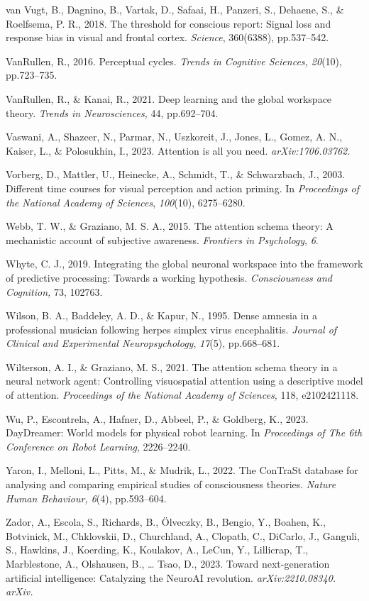 \documentclass[12pt]{article}
\begin{document}
van Vugt, B., Dagnino, B., Vartak, D., Safaai, H., Panzeri, S., Dehaene,
S., \& Roelfsema, P. R., 2018. The threshold for conscious report:
Signal loss and response bias in visual and frontal cortex.
\emph{Science}, 360(6388), pp.537--542.

VanRullen, R., 2016. Perceptual cycles. \emph{Trends in Cognitive
Sciences, 20}(10), pp.723--735.

VanRullen, R., \& Kanai, R., 2021. Deep learning and the global
workspace theory. \emph{Trends in Neurosciences,} 44, pp.692--704.

Vaswani, A., Shazeer, N., Parmar, N., Uszkoreit, J., Jones, L., Gomez,
A. N., Kaiser, L., \& Polosukhin, I., 2023. Attention is all you need.
\emph{arXiv:1706.03762.}

Vorberg, D., Mattler, U., Heinecke, A., Schmidt, T., \& Schwarzbach, J.,
2003. Different time courses for visual perception and action priming.
In \emph{Proceedings of the National Academy of Sciences},
\emph{100}(10), 6275--6280.

Webb, T. W., \& Graziano, M. S. A., 2015. The attention schema theory: A
mechanistic account of subjective awareness. \emph{Frontiers in
Psychology}, \emph{6}.

Whyte, C. J., 2019. Integrating the global neuronal workspace into the
framework of predictive processing: Towards a working hypothesis.
\emph{Consciousness and Cognition,} 73, 102763.

Wilson, B. A., Baddeley, A. D., \& Kapur, N., 1995. Dense amnesia in a
professional musician following herpes simplex virus encephalitis.
\emph{Journal of Clinical and Experimental Neuropsychology},
\emph{17}(5), pp.668--681.

Wilterson, A. I., \& Graziano, M. S., 2021. The attention schema theory
in a neural network agent: Controlling visuospatial attention using a
descriptive model of attention. \emph{Proceedings of the National
Academy of Sciences,} 118, e2102421118.

Wu, P., Escontrela, A., Hafner, D., Abbeel, P., \& Goldberg, K., 2023.
DayDreamer: World models for physical robot learning. In
\emph{Proceedings of The 6th Conference on Robot Learning}, 2226--2240.

Yaron, I., Melloni, L., Pitts, M., \& Mudrik, L., 2022. The ConTraSt
database for analysing and comparing empirical studies of consciousness
theories. \emph{Nature Human Behaviour, 6}(4), pp.593--604.

Zador, A., Escola, S., Richards, B., Ölveczky, B., Bengio, Y., Boahen,
K., Botvinick, M., Chklovskii, D., Churchland, A., Clopath, C., DiCarlo,
J., Ganguli, S., Hawkins, J., Koerding, K., Koulakov, A., LeCun, Y.,
Lillicrap, T., Marblestone, A., Olshausen, B., \ldots{} Tsao, D., 2023.
Toward next-generation artificial intelligence: Catalyzing the NeuroAI
revolution. \emph{arXiv:2210.08340. arXiv.}
\end{document}

